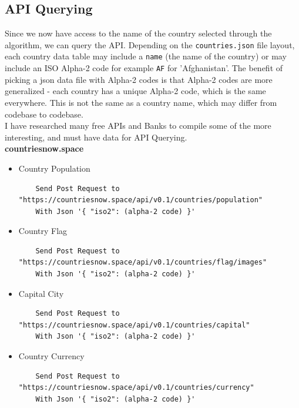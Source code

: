\subsection{API Querying}
Since we now have access to the name of the country selected through the algorithm, we can query the API. Depending on the \verb|countries.json| file layout, each country data table may include a \verb|name| (the name of the country) or may include an ISO Alpha-2 code for example \verb|AF| for 'Afghanistan'. The benefit of picking a json data file with Alpha-2 codes is that Alpha-2 codes are more generalized - each country has a unique Alpha-2 code, which is the same everywhere. This is not the same as a country name, which may differ from codebase to codebase. \\
I have researched many free APIs and Banks to compile some of the more interesting, and must have data for API Querying. \\
\textbf{countriesnow.space}
\begin{itemize}
    \item Country Population
    \begin{lstlisting}
    Send Post Request to "https://countriesnow.space/api/v0.1/countries/population"
    With Json '{ "iso2": (alpha-2 code) }'
    \end{lstlisting}

    \item Country Flag
    \begin{lstlisting}
    Send Post Request to "https://countriesnow.space/api/v0.1/countries/flag/images"
    With Json '{ "iso2": (alpha-2 code) }'
    \end{lstlisting}

    \item Capital City
    \begin{lstlisting}
    Send Post Request to "https://countriesnow.space/api/v0.1/countries/capital"
    With Json '{ "iso2": (alpha-2 code) }'
    \end{lstlisting}

    \item Country Currency
    \begin{lstlisting}
    Send Post Request to "https://countriesnow.space/api/v0.1/countries/currency"
    With Json '{ "iso2": (alpha-2 code) }'
    \end{lstlisting}
\end{itemize}

